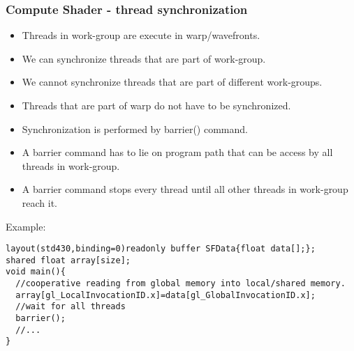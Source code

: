 \begin{frame}[fragile]
\frametitle{Compute Shader - thread synchronization}
  \begin{itemize}
    \item Threads in work-group are execute in warp/wavefronts.
    \item We can synchronize threads that are part of work-group.
    \item We cannot synchronize threads that are part of different work-groups.
    \item Threads that are part of warp do not have to be synchronized.
    \item Synchronization is performed by barrier() command.
    \item A barrier command has to lie on program path that can be access by all threads in work-group.
    \item A barrier command stops every thread until all other threads in work-group reach it.
  \end{itemize}
  Example:
{\scriptsize
\begin{verbatim}
layout(std430,binding=0)readonly buffer SFData{float data[];};
shared float array[size];
void main(){
  //cooperative reading from global memory into local/shared memory.
  array[gl_LocalInvocationID.x]=data[gl_GlobalInvocationID.x];
  //wait for all threads
  barrier();
  //...
}
\end{verbatim}
}
\end{frame}

